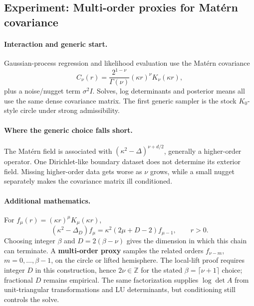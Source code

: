 \subsection{Experiment: Multi-order proxies for Matérn covariance}
\label{exp:e11}
\paragraph{Interaction and generic start.} Gaussian-process regression and likelihood evaluation use the Matérn covariance
\[
 C_\nu(r)=\frac{2^{1-\nu}}{\Gamma(\nu)}(\kappa r)^\nu K_\nu(\kappa r),
\]
plus a noise/nugget term $\sigma^2I$. Solves, log determinants and posterior means all use the same dense covariance matrix. The first generic sampler is the stock $K_0$-style circle under strong admissibility.

\paragraph{Where the generic choice falls short.} The Matérn field is associated with $(\kappa^2-\Delta)^{\nu+d/2}$, generally a higher-order operator. One Dirichlet-like boundary dataset does not determine its exterior field. Missing higher-order data gets worse as $\nu$ grows, while a small nugget separately makes the covariance matrix ill conditioned.

\paragraph{Additional mathematics.} For $f_\mu(r)=(\kappa r)^\mu K_\mu(\kappa r)$,
\begin{equation}
 (\kappa^2-\Delta_D)f_\mu
 =\kappa^2(2\mu+D-2)f_{\mu-1},\qquad r>0.
 \label{eq:e11-chain}
\end{equation}
Choosing integer $\beta$ and $D=2(\beta-\nu)$ gives the dimension in which this chain can terminate. A \textbf{multi-order proxy} samples the related orders $f_{\nu-m}$, $m=0,\ldots,\beta-1$, on the circle or lifted hemisphere. The local-lift proof requires integer $D$ in this construction, hence $2\nu\in\mathbb Z$ for the stated $\beta=\lceil\nu+1\rceil$ choice; fractional $D$ remains empirical. The same factorization supplies $\log\det A$ from unit-triangular transformations and LU determinants, but conditioning still controls the solve.

